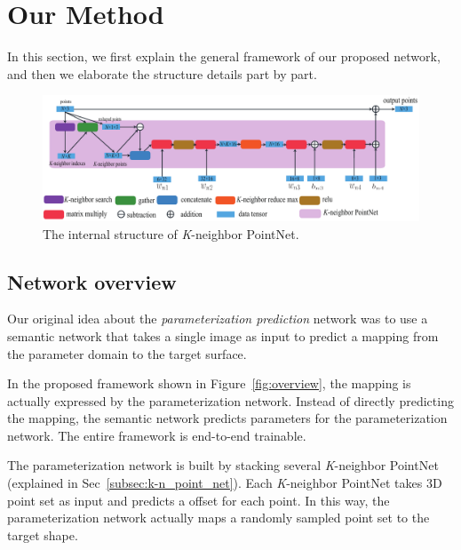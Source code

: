 \section{Our Method}
\label{sec:net}


In this section, we first explain the general framework of our proposed network, and then we elaborate the structure details part by part.

\begin{figure}[htbp]
	\centering
	\includegraphics[width=\linewidth]{img/net/k-n_pointnet}
	\caption{The internal structure of \textit{K}-neighbor PointNet.}
	\label{fig:knpointnet}
\end{figure}

\subsection{Network overview}
\label{subsec:overview}
Our original idea about the \emph{parameterization prediction} network was to use a semantic network that takes a single image as input to predict a mapping from the parameter domain to the target surface. 
%

In the proposed framework shown in Figure~\ref{fig:overview}, the mapping is actually expressed by the parameterization network. 
Instead of directly predicting the mapping, the semantic network predicts parameters for the parameterization network. The entire framework is end-to-end trainable.

The parameterization network is built by stacking several \textit{K}-neighbor PointNet (explained in Sec~\ref{subsec:k-n_point_net}). 
Each \textit{K}-neighbor PointNet takes 3D point set as input and predicts a offset for each point. 
In this way, the parameterization network actually maps a randomly sampled point set to the target shape.

